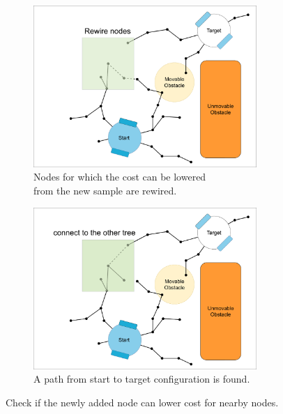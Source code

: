 \begin{figure}[H]
    \centering
    \begin{subfigure}{.49\textwidth}
    \centering
    \includegraphics[width=0.93\textwidth, cfbox=my_green 5pt 0pt]{figures/required_background/mp/5mp_rewire.drawio.png}
    \caption{Nodes for which the cost can be lowered\\from the new sample are rewired.}%
    \label{subfig:mp_rewire}
    \end{subfigure}
    \begin{subfigure}{.49\textwidth}
    \centering
    \includegraphics[width=0.93\textwidth, cfbox=my_green 5pt 0pt]{figures/required_background/mp/6mp_search_other_tree.drawio.png}
    \caption{A path from start to target configuration is found. \bs}
    \end{subfigure}
    \caption{Check if the newly added node can lower cost for nearby nodes.}
    \label{fig:motion_planner_adding_one_sample_tree}
\end{figure}


